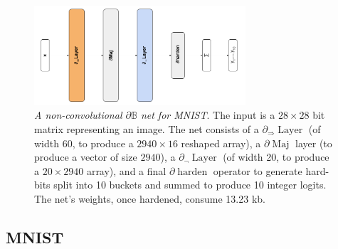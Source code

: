 \documentclass{article} %
\begin{document}
\begin{figure}[t!]
	\centering
	\includegraphics[width=0.7\textwidth]{mnist-architecture.png}
	\caption{{\em A non-convolutional $\partial\mathbb{B}$ net for MNIST}. The input is a $28\times28$ bit matrix representing an image. The net consists of a $\partial_{\Rightarrow}\!\operatorname{Layer}$ (of width 60, to produce a $2940\times16$ reshaped array), a $\partial\!\operatorname{Maj}$ layer (to produce a vector of size $2940$), a $\partial_{\neg}\!\operatorname{Layer}$ (of width 20, to produce a $20 \times 2940$ array), and a final $\partial\!\operatorname{harden}$ operator to generate hard-bits split into 10 buckets and summed to produce 10 integer logits. The net's weights, once hardened, consume 13.23 kb.}
	\label{fig:mnist-architecture}
\end{figure}

\subsection{MNIST}
\end{document}
